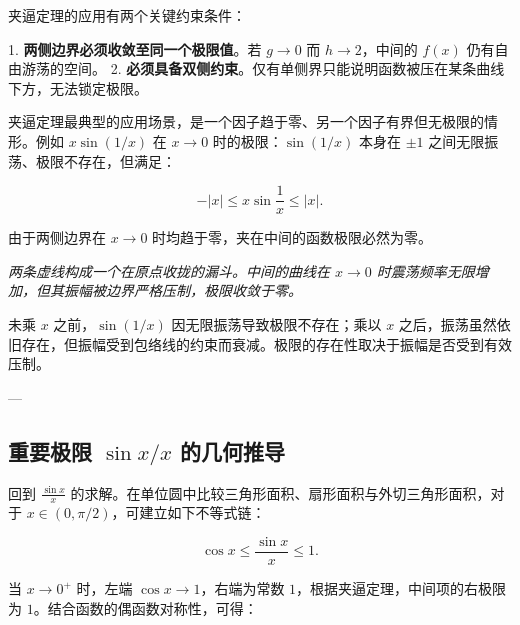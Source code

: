 夹逼定理的应用有两个关键约束条件：

1. \textbf{两侧边界必须收敛至同一个极限值}。若 \(g\to0\) 而 \(h\to2\)，中间的 \(f(x)\) 仍有自由游荡的空间。
2. \textbf{必须具备双侧约束}。仅有单侧界只能说明函数被压在某条曲线下方，无法锁定极限。

夹逼定理最典型的应用场景，是一个因子趋于零、另一个因子有界但无极限的情形。例如 \(x\sin(1/x)\) 在 \(x\to0\) 时的极限：\(\sin(1/x)\) 本身在 \(\pm1\) 之间无限振荡、极限不存在，但满足：

\[
-\lvert x\rvert\le x\sin\frac{1}{x}\le \lvert x\rvert.
\]

由于两侧边界在 \(x\to0\) 时均趋于零，夹在中间的函数极限必然为零。

\begin{center}

\emph{两条虚线构成一个在原点收拢的漏斗。中间的曲线在 \(x\to0\) 时震荡频率无限增加，但其振幅被边界严格压制，极限收敛于零。}
\end{center}

未乘 \(x\) 之前，\(\sin(1/x)\) 因无限振荡导致极限不存在；乘以 \(x\) 之后，振荡虽然依旧存在，但振幅受到包络线的约束而衰减。极限的存在性取决于振幅是否受到有效压制。

---

\subsection{重要极限 \texorpdfstring{\(\sin x/x\)}{sin x / x} 的几何推导}

回到 \(\frac{\sin x}{x}\) 的求解。在单位圆中比较三角形面积、扇形面积与外切三角形面积，对于 \(x\in(0,\pi/2)\)，可建立如下不等式链：

\[
\cos x\le \frac{\sin x}{x}\le1.
\]

当 \(x\to0^+\) 时，左端 \(\cos x\to1\)，右端为常数 \(1\)，根据夹逼定理，中间项的右极限为 \(1\)。结合函数的偶函数对称性，可得：

